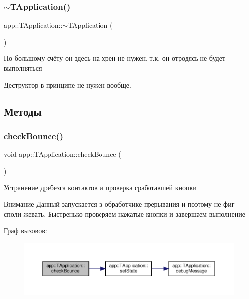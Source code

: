 \subsubsection{\texorpdfstring{$\sim$\+T\+Application()}{~TApplication()}}
{\footnotesize\ttfamily app\+::\+T\+Application\+::$\sim$\+T\+Application (\begin{DoxyParamCaption}{ }\end{DoxyParamCaption})\hspace{0.3cm}{\ttfamily [virtual]}}



По большому счёту он здесь на хрен не нужен, т.\+к. он отродясь не будет выполняться 



 Деструктор в принципе не нужен вообще. 

\subsection{Методы}
\mbox{\label{classapp_1_1_t_application_a4c4d1d33ea8ab73ba49a59528d200501}} 
\subsubsection{\texorpdfstring{check\+Bounce()}{checkBounce()}}
{\footnotesize\ttfamily void app\+::\+T\+Application\+::check\+Bounce (\begin{DoxyParamCaption}{ }\end{DoxyParamCaption})}



Устранение дребезга контактов и проверка сработавшей кнопки 

\begin{DoxyAttention}{Внимание}
Данный запускается в обработчике прерывания и поэтому не фиг споли жевать. Быстренько проверяем нажатые кнопки и завершаем выполнение 
\end{DoxyAttention}
Граф вызовов\+:\nopagebreak
\begin{figure}[H]
\begin{center}
\leavevmode
\includegraphics[width=350pt]{classapp_1_1_t_application_a4c4d1d33ea8ab73ba49a59528d200501_cgraph}
\end{center}
\end{figure}
\mbox{\label{classapp_1_1_t_application_acf71a4fe338cbc1e771cc9a60431c3bf}} 
